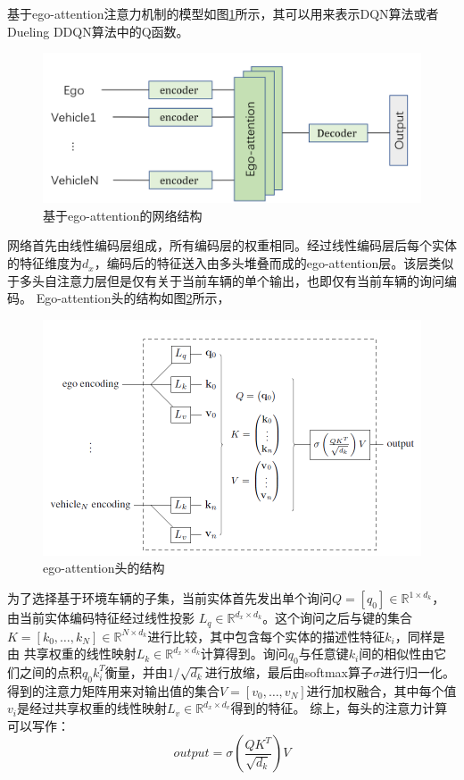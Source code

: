 \documentclass[letterpaper, 10 pt, conference]{ieeeconf}  %
\begin{document}
基于ego-attention注意力机制的模型如图\ref{fig:ego-attention}所示，其可以用来表示DQN算法或者Dueling DDQN算法中的Q函数。
\begin{figure}[htbp]
    \centering
    \includegraphics[width=\linewidth]{fig/ego-attention网络结构}
    \caption{基于ego-attention的网络结构}
    \label{fig:ego-attention}
  \end{figure}
网络首先由线性编码层组成，所有编码层的权重相同。经过线性编码层后每个实体
的特征维度为$d_x$，编码后的特征送入由多头堆叠而成的ego-attention层。该层类似于多头自注意力层\cite{vaswani2017attention}但是仅有关于当前车辆的单个输出，也即仅有当前车辆的询问编码。
Ego-attention头的结构如图\ref{fig:ego-head}所示，
\begin{figure}[htbp]
    \centering
    \includegraphics[width=\linewidth]{fig/ego-attention结构.png}
    \caption{ego-attention头的结构}
    \label{fig:ego-head}
  \end{figure}
  为了选择基于环境车辆的子集，当前实体首先发出单个询问$Q=[q_0]\in \mathbb{R} ^{1\times d_k}$，由当前实体编码特征经过线性投影
$L_q\in\mathbb{R} ^{d_x\times d_k}$。这个询问之后与键的集合$K=[k_0,\ldots,k_N]\in\mathbb{R} ^{N\times d_k}$进行比较，其中包含每个实体的描述性特征$k_i$，同样是由
共享权重的线性映射$L_k\in\mathbb{R} ^{d_x\times d_k}$计算得到。询问$q_0$与任意键$k_i$间的相似性由它们之间的点积$q_0k_i^T$衡量，并由$1/\sqrt{d_k}$进行放缩，最后由softmax算子$\sigma $进行归一化。
得到的注意力矩阵用来对输出值的集合$V=[v_0,\ldots,v_N]$进行加权融合，其中每个值$v_i$是经过共享权重的线性映射$L_v\in\mathbb{R} ^{d_x\times d_v }$得到的特征。
综上，每头的注意力计算可以写作：
\begin{equation}
    output=\sigma\left(\frac{QK^T}{\sqrt{d_k}}\right)V
    \label{con:output}
\end{equation}
\end{document}
